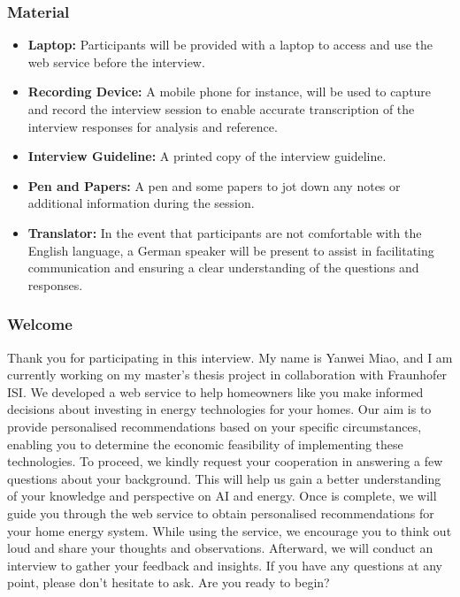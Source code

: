 \subsubsection{Material}

\begin{itemize}
  \item \textbf{Laptop:} Participants will be provided with a laptop to access and use the web service before the interview. 
  \item \textbf{Recording Device:} A mobile phone for instance, will be used to capture and record the interview session to enable accurate transcription of the interview responses for analysis and reference.
  \item \textbf{Interview Guideline:} A printed copy of the interview guideline.
  \item \textbf{Pen and Papers:} A pen and some papers to jot down any notes or additional information during the session. 
  \item \textbf{Translator:} In the event that participants are not comfortable with the English language, a German speaker will be present to assist in facilitating communication and ensuring a clear understanding of the questions and responses.
\end{itemize}


\subsubsection{Welcome}

Thank you for participating in this interview. 
My name is Yanwei Miao, and I am currently working on my master's thesis project in collaboration with Fraunhofer ISI.
We developed a web service to help homeowners like you make informed decisions about investing in energy technologies for your homes. 
Our aim is to provide personalised recommendations based on your specific circumstances, enabling you to determine the economic feasibility of implementing these technologies. 
To proceed, we kindly request your cooperation in answering a few questions about your background. 
This will help us gain a better understanding of your knowledge and perspective on AI and energy. 
Once is complete, we will guide you through the web service to obtain personalised recommendations for your home energy system. 
While using the service, we encourage you to think out loud and share your thoughts and observations. 
Afterward, we will conduct an interview to gather your feedback and insights. 
If you have any questions at any point, please don't hesitate to ask. 
Are you ready to begin?


